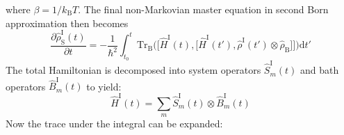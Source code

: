 \documentclass[9pt]{report}
\begin{document}
where $\beta=1/k_{\mathrm{B}}T$. The final non-Markovian master equation in second Born approximation then becomes
\begin{equation}
\frac{\partial\hat{\rho}_{\mathrm{S}}^{\mathrm{I}}(t)}{\partial t} = -\frac{1}{\hbar^2}\int_{t_0}^{t}\mathrm{Tr}_{\mathrm{B}}\Big(\big[\hat{H}^{\mathrm{I}}(t),\big[\hat{H}^{\mathrm{I}}(t'),\hat{\rho}^{\mathrm{I}}(t')\otimes\hat{\rho}_{\mathrm{B}}\big]\big]\Big)\mathrm{d}t'
\end{equation}
The total Hamiltonian is decomposed into system operators $\hat{S}^{\mathrm{I}}_{m}(t)$ and bath operators $\hat{B}_{m}^{\mathrm{I}}(t)$ to yield:
\begin{equation}
\hat{H}^{\mathrm{I}}(t)=\sum_{m}\hat{S}^{\mathrm{I}}_{m}(t)\otimes\hat{B}_{m}^{\mathrm{I}}(t)
\end{equation}
Now the trace under the integral can be expanded:
\end{document}
